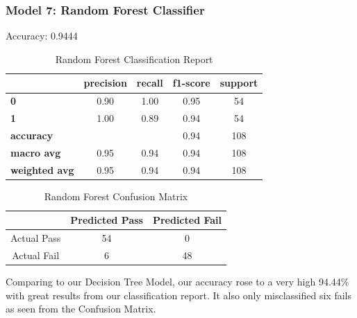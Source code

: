 \documentclass[11pt,a4paper]{article}
\begin{document}
\subsubsection{Model 7: Random Forest Classifier}
Accuracy: 0.9444
\begin{table}[H]
    \centering
    \begin{tabular}{lcccc}
        \hline
        & \textbf{precision} & \textbf{recall} & \textbf{f1-score} & \textbf{support} \\
        \hline
        \textbf{0} & 0.90 & 1.00 & 0.95 & 54 \\
        \textbf{1} & 1.00 & 0.89 & 0.94 & 54 \\
        \hline
        \textbf{accuracy} & & & 0.94 & 108 \\
        \textbf{macro avg} & 0.95 & 0.94 & 0.94 & 108 \\
        \textbf{weighted avg} & 0.95 & 0.94 & 0.94 & 108 \\
        \hline
    \end{tabular}
    \caption{Random Forest Classification Report}
    \label{tab:rfclassification_report}
\end{table}
\begin{table}[H]
    \centering
    \begin{tabular}{|c|c|c|}
        \hline
        & Predicted Pass & Predicted Fail \\ \hline
        Actual Pass & 54 & 0 \\ \hline
        Actual Fail & 6 & 48 \\ \hline
    \end{tabular}
    \caption{Random Forest Confusion Matrix}
    \label{tab:rfconfusion_matrix}
\end{table}
Comparing to our Decision Tree Model, our accuracy rose to a very high 94.44\% with great results from our classification report. It also only misclassified six fails as seen from the Confusion Matrix.
\end{document}
